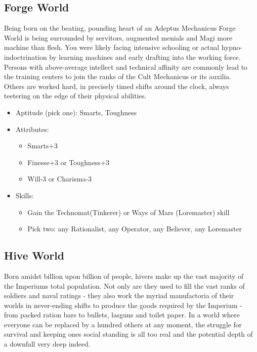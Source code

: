 \subsection{Forge World}
Being born on the beating, pounding heart of an Adeptus Mechanicus Forge World is being surrounded by servitors, augmented menials and Magi more machine than flesh. You were likely facing intensive schooling or actual hypno-indoctrination by learning machines and early drafting into the working force. Persons with above-average intellect and technical affinity are commonly lead to the training centers to join the ranks of the Cult Mechanicus or its auxilia. Others are worked hard, in precisely timed shifts around the clock, always teetering on the edge of their physical abilities.

\begin{itemize}
	\item Aptitude (pick one): Smarts, Toughness
	\item Attributes:
	\begin{itemize}
		\item Smarts+3
		\item Finesse+3 or Toughness+3
		\item Will-3 or Charisma-3
	\end{itemize}
	\item Skills: 
	\begin{itemize}
	 	\item Gain the Technomat(Tinkerer) or Ways of Mars (Loremaster) skill
	 	\item Pick two: any Rationalist, any Operator, any Believer, any Loremaster
	 \end{itemize} 
\end{itemize}

\subsection{Hive World}
Born amidst billion upon billion of people, hivers make up the vast majority of the Imperiums total population. Not only are they used to fill the vast ranks of soldiers and naval ratings - they also work the myriad manufactoria of their worlds in never-ending shifts to produce the goods required by the Imperium - from packed ration bars to bullets, lasguns and toilet paper. In a world where everyone can be replaced by a hundred others at any moment, the struggle for survival and keeping ones social standing is all too real and the potential depth of a downfall very deep indeed.

